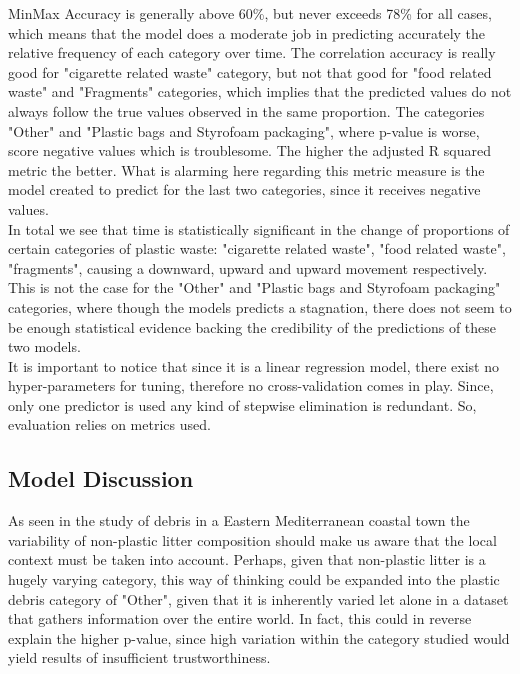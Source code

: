 \documentclass[10pt]{article}\usepackage[]{graphicx}\usepackage[]{color}
\begin{document}
MinMax Accuracy is generally above 60\%, but never exceeds 78\% for all cases, which means that the model does a moderate job in predicting accurately the relative frequency of each category over time. The correlation accuracy is really good for "cigarette related waste" category, but not that good for "food related waste" and "Fragments" categories, which implies that the predicted values do not always follow the true values observed in the same proportion. The categories "Other" and "Plastic bags and Styrofoam packaging", where p-value is worse, score negative values which is troublesome. The higher the adjusted R squared metric the better. What is alarming here regarding this metric measure is the model created to predict for the last two categories, since it receives negative values.\\

In total we see that time is statistically significant in the change of proportions of certain categories
of plastic waste: "cigarette related waste", "food related waste", "fragments", causing a downward, upward and upward movement respectively. This is not the case for the "Other" and "Plastic bags and Styrofoam packaging" categories, where though the models predicts a stagnation, there does not seem to be enough statistical evidence backing the credibility of the predictions of these two models.\\

It is important to notice that since it is a linear regression model, there exist no hyper-parameters for tuning, therefore no cross-validation comes in play. Since, only one predictor is used any kind of stepwise elimination is redundant. So, evaluation relies on metrics used.\\






\subsection{Model Discussion}


As seen in the study of debris in a Eastern Mediterranean coastal town \cite{PORTMAN2017} the variability of non-plastic litter composition should make us aware that the local context must be taken into account. Perhaps, given that non-plastic litter is a hugely varying category, this way of thinking could be expanded into the plastic debris category of "Other", given that it is inherently varied let alone in a dataset that gathers information over the entire world. In fact, this could in reverse explain the higher p-value, since high variation within the category studied would yield results of insufficient trustworthiness. 
\end{document}
